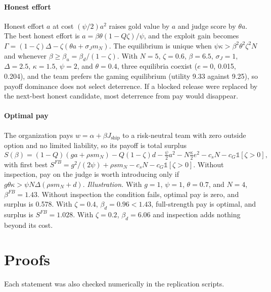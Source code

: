 \documentclass[acmsmall,screen,review]{acmart}
\theoremstyle{acmdefinition}
\begin{document}
\paragraph{Honest effort} Honest effort $a$ at cost $(\psi/2)a^2$ raises gold value by $a$ and judge score by $\theta a$. The best honest effort is $a = \beta\theta(1 - Q\zeta)/\psi$, and the exploit gain becomes $\Gamma = (1-\zeta)\Delta - \zeta(\theta a + \sigma_J m_N)$. The equilibrium is unique when $\psi\kappa > \beta^2\theta^2\zeta^2 N$ and whenever $\beta \ge \beta_u = \beta_d/(1-\zeta)$. With $N = 5$, $\zeta = 0.6$, $\beta = 6.5$, $\sigma_J = 1$, $\Delta = 2.5$, $\kappa = 1.5$, $\psi = 2$, and $\theta = 0.4$, three equilibria coexist ($e = 0$, 0.015, 0.204), and the team prefers the gaming equilibrium (utility 9.33 against 9.25), so payoff dominance does not select deterrence. If a blocked release were replaced by the next-best honest candidate, most deterrence from pay would disappear.

\paragraph{Optimal pay} The organization pays $w = \alpha + \beta J_{\text{ship}}$ to a risk-neutral team with zero outside option and no limited liability, so its payoff is total surplus
\begin{equation}
S(\beta) = (1-Q)(ga + \rho s m_N) - Q(1-\zeta)d - \tfrac{\psi}{2}a^2 - N\tfrac{\kappa}{2}e^2 - c_s N - c_G\mathbb{1}[\zeta>0], \tag{B.1}
\end{equation}
with first best $S^{FB} = g^2/(2\psi) + \rho s m_N - c_s N - c_G\mathbb{1}[\zeta>0]$. Without inspection, pay on the judge is worth introducing only if $g\theta\kappa > \psi N\Delta(\rho s m_N + d)$. \emph{Illustration.} With $g = 1$, $\psi = 1$, $\theta = 0.7$, and $N = 4$, $\beta^{FB} = 1.43$. Without inspection the condition fails, optimal pay is zero, and surplus is 0.578. With $\zeta = 0.4$, $\beta_d = 0.96 < 1.43$, full-strength pay is optimal, and surplus is $S^{FB} = 1.028$. With $\zeta = 0.2$, $\beta_d = 6.06$ and inspection adds nothing beyond its cost.

\section{Proofs}\label{app:proofs}

Each statement was also checked numerically in the replication scripts.
\end{document}
